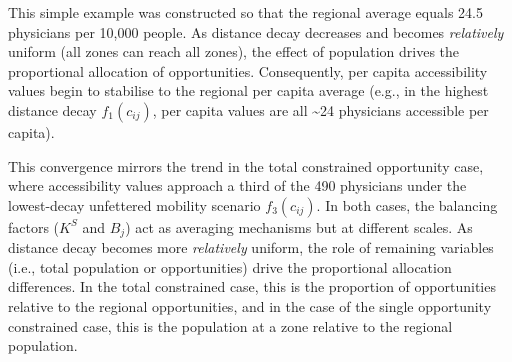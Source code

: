 \documentclass[
  10pt,
  letterpaper,
]{article}
\begin{document}
\begin{table}

\caption{\label{tbl-simple-example-attraction-constrained-accessibility-per-capita}Simple
system: singly constrained accessible opportunities per capita.}


\end{table}%

This simple example was constructed so that the regional average equals
24.5 physicians per 10,000 people. As distance decay decreases and
becomes \emph{relatively} uniform (all zones can reach all zones), the
effect of population drives the proportional allocation of
opportunities. Consequently, per capita accessibility values begin to
stabilise to the regional per capita average (e.g., in the highest
distance decay \(f_1(c_{ij})\), per capita values are all
\textasciitilde24 physicians accessible per capita).

This convergence mirrors the trend in the total constrained opportunity
case, where accessibility values approach a third of the 490 physicians
under the lowest-decay unfettered mobility scenario \(f_3(c_{ij})\). In
both cases, the balancing factors (\(K^S\) and \(B_j\)) act as averaging
mechanisms but at different scales. As distance decay becomes more
\emph{relatively} uniform, the role of remaining variables (i.e., total
population or opportunities) drive the proportional allocation
differences. In the total constrained case, this is the proportion of
opportunities relative to the regional opportunities, and in the case of
the single opportunity constrained case, this is the population at a
zone relative to the regional population.
\end{document}
